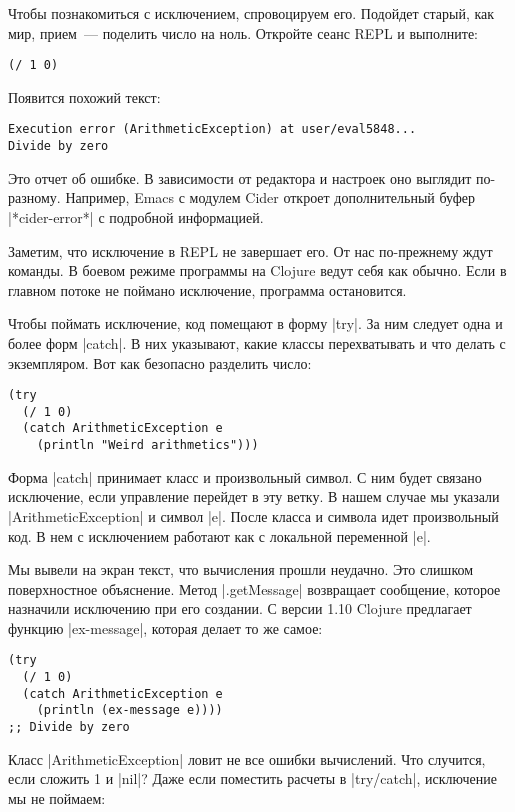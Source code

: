 Чтобы познакомиться с исключением, спровоцируем его. Подойдет старый, как мир,
прием~--- поделить число на ноль. Откройте сеанс REPL и выполните:

\begin{verbatim}
(/ 1 0)
\end{verbatim}

\noindent
Появится похожий текст:

\begin{verbatim}
Execution error (ArithmeticException) at user/eval5848...
Divide by zero
\end{verbatim}

Это отчет об ошибке. В зависимости от редактора и настроек оно выглядит
по-разному. Например, Emacs с модулем Cider откроет дополнительный буфер
\spverb|*cider-error*| с подробной информацией.

Заметим, что исключение в REPL не завершает его. От нас по-прежнему ждут
команды. В боевом режиме программы на Clojure ведут себя как обычно. Если в
главном потоке не поймано исключение, программа остановится.

Чтобы поймать исключение, код помещают в форму \spverb|try|. За ним следует одна
и более форм \spverb|catch|. В них указывают, какие классы перехватывать и что
делать с экземпляром. Вот как безопасно разделить число:

\begin{verbatim}
(try
  (/ 1 0)
  (catch ArithmeticException e
    (println "Weird arithmetics")))
\end{verbatim}

Форма \spverb|catch| принимает класс и произвольный символ. С ним будет связано
исключение, если управление перейдет в эту ветку. В нашем случае мы указали
\spverb|ArithmeticException| и символ \spverb|e|. После класса и символа идет
произвольный код. В нем с исключением работают как с локальной переменной
\spverb|e|.

Мы вывели на экран текст, что вычисления прошли неудачно. Это слишком
поверхностное объяснение. Метод \spverb|.getMessage| возвращает сообщение,
которое назначили исключению при его создании. С версии 1.10 Clojure предлагает
функцию \spverb|ex-message|, которая делает то же самое:

\begin{verbatim}
(try
  (/ 1 0)
  (catch ArithmeticException e
    (println (ex-message e))))
;; Divide by zero
\end{verbatim}

Класс \spverb|ArithmeticException| ловит не все ошибки вычислений. Что случится,
если сложить 1 и \spverb|nil|? Даже если поместить расчеты в \spverb|try/catch|,
исключение мы не поймаем:

